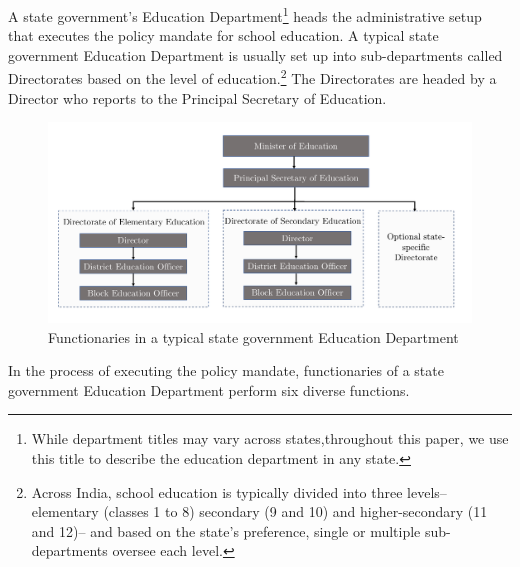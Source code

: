 \documentclass[a4paper, 12pt, twoside]{article}
\begin{document}
A state government’s Education Department\footnote{While department titles may vary across states,throughout this paper, we use this title to describe the education department in any state.} heads the administrative setup that executes the policy mandate for school education. A typical state government Education Department is usually set up into sub-departments called Directorates based on the level of education.\footnote{Across India, school education is typically divided into three levels–elementary (classes 1 to 8) secondary (9 and 10) and higher-secondary (11 and 12)– and based on the state’s preference, single or multiple sub-departments oversee each level.} The Directorates are headed by a Director who reports to the Principal Secretary of Education.

\begin{figure}[H]
 \centering
\includegraphics[page=1, width = 16.5cm]{figure2}
\caption{Functionaries in a typical state government Education Department}
\end{figure}

In the process of executing the policy mandate, functionaries of a state government Education Department perform six diverse functions.
\end{document}
